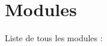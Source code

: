\section{Modules}
Liste de tous les modules \+:\begin{DoxyCompactList}
\item {}
\end{DoxyCompactList}
